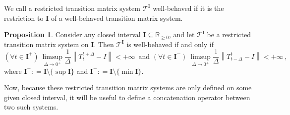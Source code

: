 \documentclass[10pt,a4paper]{paper}
\theoremstyle{definition}
\newtheorem{proposition}[theorem]{Proposition}
\newcommand{\reals}{\mathbb{R}}
\newcommand{\realsnonneg}{\reals_{\geq 0}}
\newcommand{\norm}[1]{\left\lVert #1 \right\rVert}
\newcommand{\coloneqq}{:\!=}
\begin{document}
We call a restricted transition matrix system $\mathcal{T}^{\mathbf{I}}$ well-behaved if it is the restriction to $\mathbf{I}$ of a well-behaved transition matrix system.

\begin{proposition}\label{prop:well_restr_trans_mat_system_if_limsup}
Consider any closed interval $\mathbf{I}\subseteq\realsnonneg$, and let $\mathcal{T}^{\mathbf{I}}$ be a restricted transition matrix system on $\mathbf{I}$. Then $\mathcal{T}^{\mathbf{I}}$ is well-behaved if and only if
\begin{equation}\label{eq:wellbehavedrestrictedtransitionmatrixsystem}%
(\forall t\in\mathbf{I}^+)~\limsup_{\Delta\to 0^{+}}\frac{1}{\Delta}\norm{T_{t}^{t+\Delta}-I}<+\infty\,
\text{~and~}
(\forall t\in\mathbf{I}^-)~\limsup_{\Delta\to 0^{+}}\frac{1}{\Delta}\norm{T_{t-\Delta}^t-I}<+\infty\,,
\end{equation}
where $\mathbf{I}^+\coloneqq\mathbf{I}\setminus\{\sup\mathbf{I}\}$ and $\mathbf{I}^-\coloneqq\mathbf{I}\setminus\{\min\mathbf{I}\}$.%
\end{proposition}



Now, because these restricted transition matrix systems are only defined on some given closed interval, it will be useful to define a concatenation operator between two such systems. %
\end{document}
